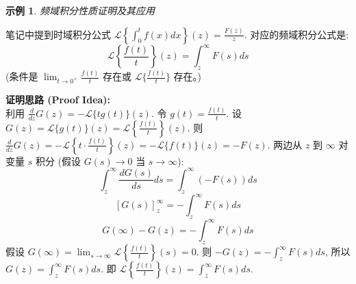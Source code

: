 \documentclass[linespread=1.5,openany]{book}%
\def\diff{d}%
\theoremstyle{plain}
\newtheorem{example}[theorem]{示例}
\newcommand{\diff}{\mathop{}\!\mathrm{d}}  %
\begin{document}
{{{{{{								\begin{example}频域积分性质证明及其应用 \label{ex:L15_freq_int_new}
								\end{example}
								\noindent 笔记中提到时域积分公式 $\mathcal{L}\left\{\int_0^t f(x)\diff x\right\}(z) = \frac{F(z)}{z}$.
								对应的频域积分公式是:
								\begin{equation} \label{eq:L15_freq_int_prop_new}
									\mathcal{L}\left\{\frac{f(t)}{t}\right\}(z) = \int_{z}^{\infty} F(s) \diff s
								\end{equation}
								(条件是 $\lim_{t\to 0^+} \frac{f(t)}{t}$ 存在或 $\mathcal{L}\{\frac{f(t)}{t}\}$ 存在。)
								
								\noindent\textbf{证明思路 (Proof Idea):} \\
								利用 $\frac{\diff}{\diff z} G(z) = -\mathcal{L}\{tg(t)\}(z)$.
								令 $g(t) = \frac{f(t)}{t}$. 设 $G(z) = \mathcal{L}\{g(t)\}(z) = \mathcal{L}\left\{\frac{f(t)}{t}\right\}(z)$.
								则 $\frac{\diff}{\diff z} G(z) = -\mathcal{L}\left\{t \cdot \frac{f(t)}{t}\right\}(z) = -\mathcal{L}\{f(t)\}(z) = -F(z)$.
								两边从 $z$ 到 $\infty$ 对变量 $s$ 积分 (假设 $G(s) \to 0$ 当 $s \to \infty$):
								\[ \int_z^\infty \frac{\diff G(s)}{\diff s} \diff s = \int_z^\infty (-F(s)) \diff s \]
								\[ [G(s)]_z^\infty = -\int_z^\infty F(s) \diff s \]
								\[ G(\infty) - G(z) = -\int_z^\infty F(s) \diff s \]
								假设 $G(\infty) = \lim_{s\to\infty} \mathcal{L}\left\{\frac{f(t)}{t}\right\}(s) = 0$.
								则 $-G(z) = -\int_z^\infty F(s) \diff s$, 所以 $G(z) = \int_z^\infty F(s) \diff s$.
								即 $\mathcal{L}\left\{\frac{f(t)}{t}\right\}(z) = \int_{z}^{\infty} F(s) \diff s$.
								\vspace{\smallskipamount} %
								
}}}}}}
\end{document}
